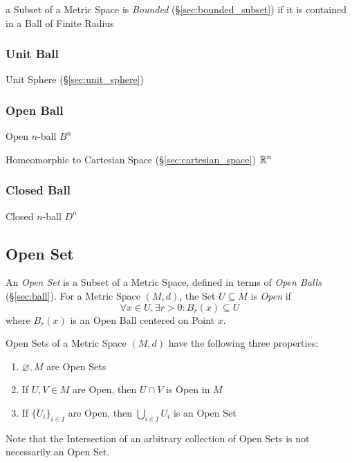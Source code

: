 a Subset of a Metric Space is \emph{Bounded} (\S\ref{sec:bounded_subset}) if it
is contained in a Ball of Finite Radius



\subsubsection{Unit Ball}\label{sec:unit_ball}

Unit Sphere (\S\ref{sec:unit_sphere})



\subsubsection{Open Ball}\label{sec:open_ball}

Open $n$-ball $B^n$

Homeomorphic to Cartesian Space (\S\ref{sec:cartesian_space})
$\mathbb{R}^n$



\subsubsection{Closed Ball}\label{sec:closed_ball}

Closed $n$-ball $D^n$



\subsection{Open Set}\label{sec:open_set}

An \emph{Open Set} is a Subset of a Metric Space, defined in terms of
\emph{Open Balls} (\S\ref{sec:ball}). For a Metric Space $(M,d)$, the
Set $U \subseteq M$ is \emph{Open} if
\[
  \forall x \in U, \exists r > 0 : B_r(x) \subseteq U
\]
where $B_r(x)$ is an Open Ball centered on Point $x$.

Open Sets of a Metric Space $(M,d)$ have the following three
properties:
\begin{enumerate}
\item $\varnothing, M$ are Open Sets
\item If $U, V \in M$ are Open, then $U \cap V$ is Open in $M$
\item If $\{ U_i \}_{i \in I}$ are Open, then $\bigcup_{i \in I}
  U_i$ is an Open Set
\end{enumerate}
\fist Note that the Intersection of an arbitrary collection of
Open Sets is not necessarily an Open Set.

